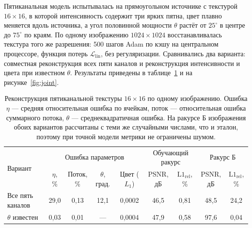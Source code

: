 Пятиканальная модель испытывалась на прямоугольном источнике с текстурой $16\times16$, в которой интенсивность содержит три ярких пятна, цвет плавно меняется вдоль источника, а угол половинной мощности $\theta$ растёт от $25^\circ$ в центре до $75^\circ$ по краям. По одному изображению $1024\times1024$ восстанавливалась текстура того же разрешения: 500 шагов Adam по кэшу на центральном процессоре, функция потерь $\mathcal{L}_{\mathrm{lin}}$, без регуляризации. Сравнивались два варианта: совместная реконструкция всех пяти каналов и реконструкция интенсивности и цвета при известном $\theta$. Результаты приведены в таблице~\ref{tab:joint} и на рисунке~\ref{fig:joint}.

\begin{table}[htbp]
    \centering
    \small
    \setlength{\tabcolsep}{3.5pt}
    \caption{Реконструкция пятиканальной текстуры $16\times16$ по одному изображению. Ошибка $\eta$ --- средняя относительная ошибка по ячейкам, поток --- относительная ошибка суммарного потока, $\theta$ --- среднеквадратичная ошибка. На ракурсе Б изображения обоих вариантов рассчитаны с теми же случайными числами, что и эталон, поэтому при точной модели метрики не ограничены шумом.}
    \label{tab:joint}
    \begin{tabular}{lcccccccc}
        \toprule
        \multirow{2}{*}{Вариант} & \multicolumn{4}{c}{Ошибка параметров} & \multicolumn{2}{c}{Обучающий ракурс} & \multicolumn{2}{c}{Ракурс Б} \\
        \cmidrule(lr){2-5}\cmidrule(lr){6-7}\cmidrule(lr){8-9}
        & \makecell{$\eta$,\\\%} & \makecell{Поток,\\\%} & \makecell{$\theta$,\\град.} & \makecell{Цвет\\($L_1$)} & \makecell{PSNR,\\дБ} & \makecell{$\mathrm{L1}_{\mathrm{rel}}$,\\\%} & \makecell{PSNR,\\дБ} & \makecell{$\mathrm{L1}_{\mathrm{rel}}$,\\\%} \\
        \midrule[\heavyrulewidth]
        Все пять каналов       & 29,0 & 0,13 & 12,1 & 0,0002 & 46,5 & 0,81 & 48,5 & 24,2 \\
        $\theta$ известен      & 0,03 & 0,01 & ---  & 0,0004 & 47,9 & 0,58 & 97,6 & 0,04 \\
        \bottomrule
    \end{tabular}
\end{table}

